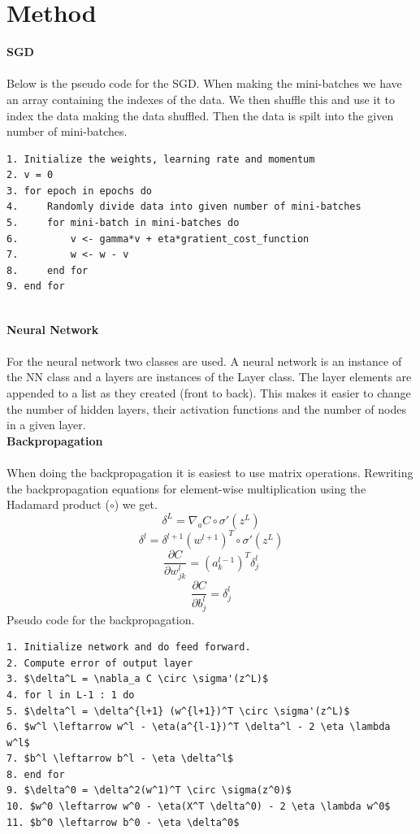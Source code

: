 \documentclass[12pt, letterpaper, twoside]{article}
\begin{document}
\section{Method}
\textbf{SGD}\\
\ \\
Below is the pseudo code for the SGD. When making the mini-batches we have an array containing the indexes of the data. We then shuffle this and use it to index the data making the data shuffled. Then the data is spilt into the given number of mini-batches.\\
\begin{verbatim}
1. Initialize the weights, learning rate and momentum
2. v = 0
3. for epoch in epochs do
4.     Randomly divide data into given number of mini-batches
5.     for mini-batch in mini-batches do
6.         v <- gamma*v + eta*gratient_cost_function
7.         w <- w - v
8.	   end for
9. end for	   
\end{verbatim}
\ \\
\textbf{Neural Network}\\
\ \\
For the neural network two classes are used. A neural network is an instance of the NN class and a layers are instances of the Layer class. The layer elements are appended to a list as they created (front to back). This makes it easier to change the number of hidden layers, their activation functions and the number of nodes in a given layer.  
\newpage
\ \\
\textbf{Backpropagation}\\
\ \\
When doing the backpropagation it is easiest to use matrix operations. Rewriting the backpropagation equations for element-wise multiplication using the Hadamard product ($\circ$) we get.
$$
\delta^L = \nabla_a C \circ \sigma'(z^L)
$$
$$
\delta^l = \delta^{l+1} (w^{l+1})^T \circ \sigma'(z^L)
$$
$$
\frac{\partial C}{\partial w_{jk}^l} = (a_k^{l-1})^T \delta_j^l
$$
$$
\frac{\partial C}{\partial b_j^l} = \delta_j^l
$$
Pseudo code for the backpropagation.\\
\begin{lstlisting}
1. Initialize network and do feed forward.
2. Compute error of output layer
3. $\delta^L = \nabla_a C \circ \sigma'(z^L)$
4. for l in L-1 : 1 do
5. $\delta^l = \delta^{l+1} (w^{l+1})^T \circ \sigma'(z^L)$
6. $w^l \leftarrow w^l - \eta(a^{l-1})^T \delta^l - 2 \eta \lambda w^l$
7. $b^l \leftarrow b^l - \eta \delta^l$
8. end for
9. $\delta^0 = \delta^2(w^1)^T \circ \sigma(z^0)$
10. $w^0 \leftarrow w^0 - \eta(X^T \delta^0) - 2 \eta \lambda w^0$
11. $b^0 \leftarrow b^0 - \eta \delta^0$
\end{lstlisting}
\end{document}
